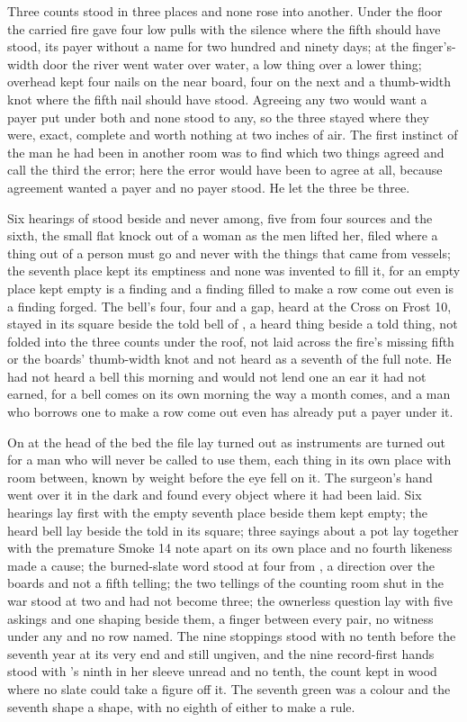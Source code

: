 Three counts stood in three places and none rose into another. Under the floor the carried fire gave four low pulls with the silence where the fifth should have stood, its payer without a name for two hundred and ninety days; at the finger's-width door the river went water over water, a low thing over a lower thing; overhead  kept four nails on the near board, four on the next and a thumb-width knot where the fifth nail should have stood. Agreeing any two would want a payer put under both and none stood to any, so the three stayed where they were, exact, complete and worth nothing at two inches of air. The first instinct of the man he had been in another room was to find which two things agreed and call the third the error; here the error would have been to agree at all, because agreement wanted a payer and no payer stood. He let the three be three.

Six hearings of  stood beside and never among, five from four sources and the sixth, the small flat knock out of a woman as the men lifted her, filed where a thing out of a person must go and never with the things that came from vessels; the seventh place kept its emptiness and none was invented to fill it, for an empty place kept empty is a finding and a finding filled to make a row come out even is a finding forged. The bell's four, four and a gap, heard at the Cross on Frost 10, stayed in its square beside the told bell of , a heard thing beside a told thing, not folded into the three counts under the roof, not laid across the fire's missing fifth or the boards' thumb-width knot and not heard as a seventh of the full note. He had not heard a bell this morning and would not lend one an ear it had not earned, for a bell comes on its own morning the way a month comes, and a man who borrows one to make a row come out even has already put a payer under it.

\scenebreak

On  at the head of the bed the file lay turned out as instruments are turned out for a man who will never be called to use them, each thing in its own place with room between, known by weight before the eye fell on it. The surgeon's hand went over it in the dark and found every object where it had been laid. Six hearings lay first with the empty seventh place beside them kept empty; the heard bell lay beside the told in its square; three sayings about a pot lay together with the premature Smoke 14 note apart on its own place and no fourth likeness made a cause; the burned-slate word stood at four from , a direction over the boards and not a fifth telling; the two tellings of the counting room shut in the war stood at two and had not become three; the ownerless question lay with five askings and one shaping beside them, a finger between every pair, no witness under any and no row named. The nine stoppings stood with no tenth before the seventh year at its very end and still ungiven, and the nine record-first hands stood with 's ninth in her sleeve unread and no tenth, the count kept in wood where no slate could take a figure off it. The seventh green was a colour and the seventh shape a shape, with no eighth of either to make a rule.

